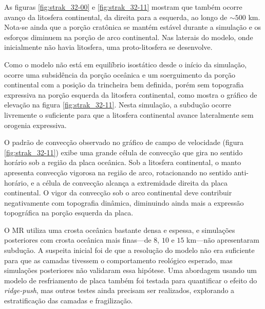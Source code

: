 As figuras \ref{fig:strak_32-00} e \ref{fig:strak_32-11} mostram que também ocorre avanço da litosfera continental, da direita para a esquerda, ao longo de $\sim500$ km. Nota-se ainda que a porção cratônica se mantém estável durante a simulação e os esforços diminuem na porção de arco continental. Nas laterais do modelo, onde inicialmente não havia litosfera, uma proto-litosfera se desenvolve.

Como o modelo não está em equilíbrio isostático desde o início da simulação, ocorre uma subsidência da porção oceânica e um soerguimento da porção continental com a posição da trincheira bem definida, porém sem topografia expressiva na porção esquerda da litosfera continental, como mostra o gráfico de elevação na figura \ref{fig:strak_32-11}. Nesta simulação, a subdução ocorre livremente o suficiente para que a litosfera continental avance lateralmente sem orogenia expressiva.

O padrão de convecção observado no gráfico de campo de velocidade (figura \ref{fig:strak_32-11}) exibe uma grande célula de convecção que gira no sentido horário sob a região da placa oceânica. Sob a litosfera continental, o manto apresenta convecção vigorosa na região de arco, rotacionando no sentido anti-horário, e a célula de convecção alcança a extremidade direita da placa continental. O vigor da convecção sob o arco continental deve contribuir negativamente com topografia dinâmica, diminuindo ainda mais a expressão topográfica na porção esquerda da placa.

O MR utiliza uma crosta oceânica bastante densa e espessa, e simulações posteriores com crosta oceânica mais finas---de $8$, $10$ e $15$ km---não apresentaram subdução. A suspeita inicial foi de que a resolução do modelo não era suficiente para que as camadas tivessem o comportamento reológico esperado, mas simulações posteriores não validaram essa hipótese. Uma abordagem usando um modelo de resfriamento de placa \citep{turcotte2002geodynamics} também foi testada para quantificar o efeito do \textit{ridge-push}, mas outros testes ainda precisam ser realizados, explorando a estratificação das camadas e fragilização.



